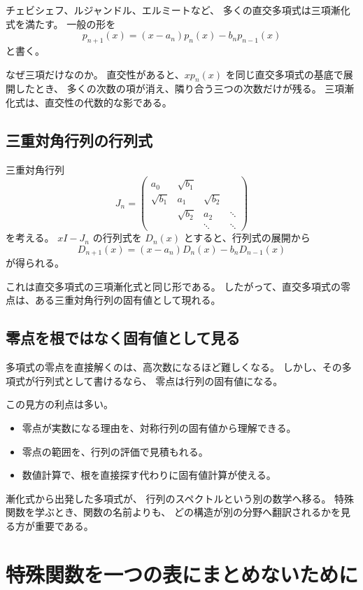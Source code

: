 チェビシェフ、ルジャンドル、エルミートなど、
多くの直交多項式は三項漸化式を満たす。
一般の形を
\[
  p_{n+1}(x)
  =(x-a_n)p_n(x)-b_np_{n-1}(x)
\]
と書く。

なぜ三項だけなのか。
直交性があると、$xp_n(x)$ を同じ直交多項式の基底で展開したとき、
多くの次数の項が消え、隣り合う三つの次数だけが残る。
三項漸化式は、直交性の代数的な影である。

\subsection{三重対角行列の行列式}

三重対角行列
\[
  J_n=
  \begin{pmatrix}
    a_0&\sqrt{b_1}&&\\
    \sqrt{b_1}&a_1&\sqrt{b_2}&\\
    &\sqrt{b_2}&a_2&\ddots\\
    &&\ddots&\ddots
  \end{pmatrix}
\]
を考える。
$xI-J_n$ の行列式を $D_n(x)$ とすると、行列式の展開から
\[
  D_{n+1}(x)
  =(x-a_n)D_n(x)-b_nD_{n-1}(x)
\]
が得られる。

これは直交多項式の三項漸化式と同じ形である。
したがって、直交多項式の零点は、ある三重対角行列の固有値として現れる。

\subsection{零点を根ではなく固有値として見る}

多項式の零点を直接解くのは、高次数になるほど難しくなる。
しかし、その多項式が行列式として書けるなら、
零点は行列の固有値になる。

この見方の利点は多い。

\begin{itemize}
  \item 零点が実数になる理由を、対称行列の固有値から理解できる。
  \item 零点の範囲を、行列の評価で見積もれる。
  \item 数値計算で、根を直接探す代わりに固有値計算が使える。
\end{itemize}

漸化式から出発した多項式が、
行列のスペクトルという別の数学へ移る。
特殊関数を学ぶとき、関数の名前よりも、
どの構造が別の分野へ翻訳されるかを見る方が重要である。

\section{特殊関数を一つの表にまとめないために}

